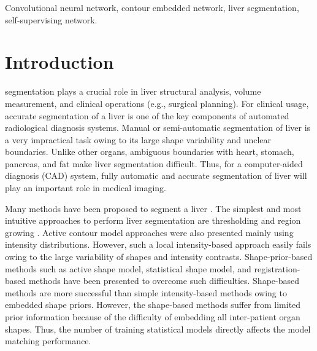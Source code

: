 \documentclass[journal]{IEEEtran}
\begin{document}
\begin{IEEEkeywords}
Convolutional neural network, contour embedded network, liver segmentation, self-supervising network.
\end{IEEEkeywords}


\IEEEpeerreviewmaketitle


\section{Introduction}

 segmentation plays a crucial role in liver structural analysis, volume measurement, and clinical operations (e.g., surgical planning). For clinical usage, accurate segmentation of a liver is one of the key components of automated radiological diagnosis systems. Manual or semi-automatic segmentation of liver is a very impractical task owing to its large shape variability and unclear boundaries. Unlike other organs, ambiguous boundaries with heart, stomach, pancreas, and fat make liver segmentation difficult. Thus, for a computer-aided diagnosis (CAD) system, fully automatic and accurate segmentation of liver will play an important role in medical imaging.\par
Many methods have been proposed to segment a liver \cite{lim2006automatic, rusko2007fully, suzuki2010computer, lee2007efficient, zhang2010automatic, okada2007automated, ling2008hierarchical, heimann2009comparison, campadelli2009liver, van2007automatic}. The simplest and most intuitive approaches to perform liver segmentation are thresholding and region growing \cite{lim2006automatic, rusko2007fully}. Active contour model approaches \cite{suzuki2010computer, lee2007efficient} were also presented mainly using intensity distributions. However, such a local intensity-based approach easily fails owing to the large variability of shapes and intensity contrasts. Shape-prior-based methods such as active shape model, statistical shape model, and registration-based methods \cite{ling2008hierarchical, zhang2010automatic, okada2007automated,  heimann2007statistical, kainmuller2007shape, wimmer2009generic, van2007automatic} have been presented to overcome such difficulties. Shape-based methods are more successful than simple intensity-based methods owing to embedded shape priors. However, the shape-based methods suffer from limited prior information because of the difficulty of embedding all inter-patient organ shapes. Thus, the number of training statistical models directly affects the model matching performance.\par
\end{document}
